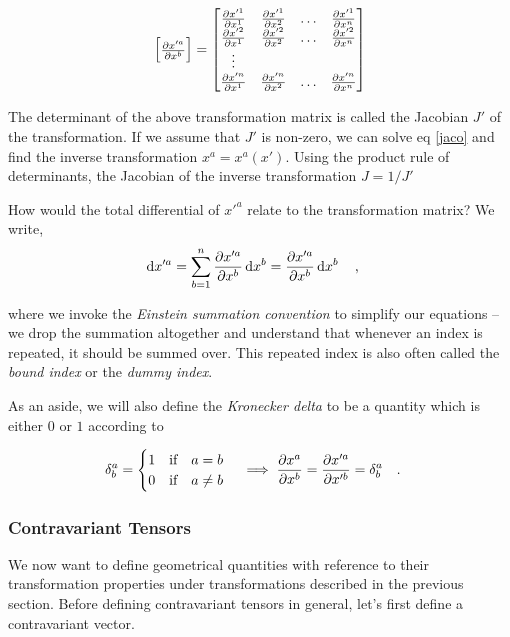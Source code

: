 \documentclass[a4paper,11pt]{article}
\begin{document}
\begin{equation}\label{jaco}
\mqty[\pdv{x'^a}{x^b}] = \mqty[\pdv{x'^1}{x^1} & \pdv{x'^1}{x^2} & \ldots & \pdv{x'^1}{x^n} \\
\pdv{x'^2}{x^1} & \pdv{x'^2}{x^2} & \ldots & \pdv{x'^2}{x^n} \\
\vdots & & & \\
\pdv{x'^n}{x^1} & \pdv{x'^n}{x^2} & \ldots & \pdv{x'^n}{x^n} 
]
\end{equation}

The determinant of the above transformation matrix is called the Jacobian $ J' $ of the transformation. If we assume that $ J' $ is non-zero, we can solve eq \ref{jaco} and find the inverse transformation $ x^a = x^a(x') $. Using the product rule of determinants, the Jacobian of the inverse transformation $ J = 1/J'$ 

How would the total differential of $ x'^a $ relate to the transformation matrix? We write,
\begin{equation}\label{difftransform}
\dd{x'^a} = \sum_{b = 1}^{n} \pdv{x'^a}{x^b} \dd{x^b} = \pdv{x'^a}{x^b} \dd{x^b}  \qq{,}
\end{equation}

where we invoke the \textit{Einstein summation convention} to simplify our equations -- we drop the summation altogether and understand that whenever an index is repeated, it should be summed over. This repeated index is also often called the \textit{bound index} or the \textit{dummy index}.

As an aside, we will also define the \textit{Kronecker delta} to be a quantity which is either $ 0 $ or $ 1 $ according to

\begin{equation}\label{key}
\delta^a_b = \begin{cases}
1 \qq{if} a = b\\
0 \qq{if} a \ne b
\end{cases} \implies \pdv{x^a}{x^b} = \pdv{x'^a}{x'^b} = \delta^a_b \qq{.}
\end{equation}

\subsubsection{Contravariant Tensors}
We now want to define geometrical quantities with reference to their transformation properties under transformations described in the previous section. Before defining contravariant tensors in general, let's first define a contravariant vector.
\end{document}
